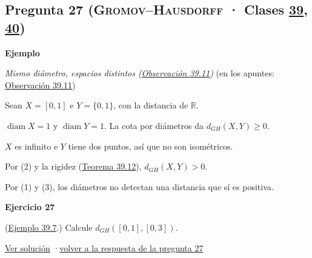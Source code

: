 \documentclass[11pt,a4paper]{article}
\newcommand{\R}{\mathbb{R}}\newcommand{\N}{\mathbb{N}}\newcommand{\Q}{\mathbb{Q}}
\DeclareMathOperator{\diam}{diam}\DeclareMathOperator{\dis}{dis}\DeclareMathOperator{\dist}{dist}
\newcommand{\bloque}[1]{\par\smallskip\noindent\textbf{\color{acento}#1}\par}
\begin{document}
\subsection*{\hypertarget{e-27}{}Pregunta 27 \normalfont\small(\textsc{Gromov–Hausdorff} · Clases \href{https://decostruttivismo.github.io/MAT2514-repaso/pdf/MAT2514_apuntes_completos.pdf\#nameddest=section.39}{39}, \href{https://decostruttivismo.github.io/MAT2514-repaso/pdf/MAT2514_apuntes_completos.pdf\#nameddest=section.40}{40})}
\bloque{Ejemplo}
\textit{Mismo diámetro, espacios distintos (\href{https://decostruttivismo.github.io/MAT2514-repaso/pdf/MAT2514_apuntes_completos.pdf\#nameddest=teorema.39.11}{Observación 39.11})} {\small(en los apuntes: \href{https://decostruttivismo.github.io/MAT2514-repaso/pdf/MAT2514_apuntes_completos.pdf\#nameddest=teorema.39.11}{Observación 39.11})}
\begin{pasos}
\item[] Sean $X=[0,1]$ e $Y=\{0,1\}$, con la distancia de $\R$.
\item[(1)] $\diam X=1$ y $\diam Y=1$. La cota por diámetros da $d_{GH}(X,Y)\ge0$.
\item[(2)] $X$ es infinito e $Y$ tiene dos puntos, así que no son isométricos.
\item[(3)] Por (2) y la rigidez (\href{https://decostruttivismo.github.io/MAT2514-repaso/pdf/MAT2514_apuntes_completos.pdf\#nameddest=teorema.39.12}{Teorema 39.12}), $d_{GH}(X,Y)\gt 0$.
\item[] Por (1) y (3), los diámetros no detectan una distancia que sí es positiva.
\end{pasos}
\bloque{\hypertarget{x-27}{}Ejercicio 27}
(\href{https://decostruttivismo.github.io/MAT2514-repaso/pdf/MAT2514_apuntes_completos.pdf\#nameddest=teorema.39.7}{Ejemplo 39.7}.) Calcule $d_{GH}([0,1],[0,3])$.
\par{\small \hyperlink{s-27}{Ver solución} \quad·\quad \hyperlink{r-27}{volver a la respuesta de la pregunta 27}}
\end{document}
